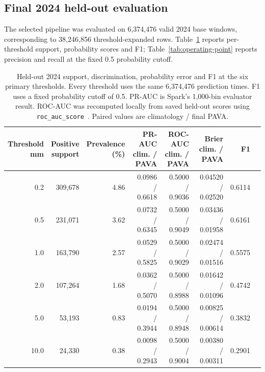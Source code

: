 \subsection{Final 2024 held-out evaluation}
The selected pipeline was evaluated on 6,374,476 valid 2024 base windows,
corresponding to 38,246,856 threshold-expanded rows.
Table~\ref{tab:test} reports per-threshold support, probability scores and
F1; Table~\ref{tab:operating-point} reports precision and recall at the fixed
0.5 probability cutoff.

\begin{table}[htbp]
\centering\scriptsize
\caption{Held-out 2024 support, discrimination, probability error and F1 at
the six primary thresholds. Every threshold uses the same 6,374,476 prediction
times. F1 uses a fixed probability cutoff of 0.5. PR-AUC is Spark's 1,000-bin
evaluator result. ROC-AUC was recomputed locally from saved held-out scores
using \texttt{roc\_auc\_score}~\cite{sklearnroc}. Paired values are
climatology / final PAVA.}
\label{tab:test}
\begin{tabular}{r r r r r r r r}
\toprule
\shortstack{Threshold\\mm} &
\shortstack{Positive\\support} &
\shortstack{Prevalence\\(\%)} &
\shortstack{PR-AUC\\clim. / PAVA} &
\shortstack{ROC-AUC\\clim. / PAVA} &
\shortstack{Brier\\clim. / PAVA} &
F1 \\
\midrule
0.2 & 309,678 & 4.86 & 0.0986 / 0.6618 & 0.5000 / 0.9036 & 0.04520 / 0.02520 & 0.6114 \\
0.5 & 231,071 & 3.62 & 0.0732 / 0.6345 & 0.5000 / 0.9049 & 0.03436 / 0.01958 & 0.6161 \\
1.0 & 163,790 & 2.57 & 0.0529 / 0.5825 & 0.5000 / 0.9029 & 0.02474 / 0.01516 & 0.5575 \\
2.0 & 107,264 & 1.68 & 0.0362 / 0.5070 & 0.5000 / 0.8988 & 0.01642 / 0.01096 & 0.4742 \\
5.0 & 53,193 & 0.83 & 0.0194 / 0.3944 & 0.5000 / 0.8948 & 0.00825 / 0.00614 & 0.3832 \\
10.0 & 24,330 & 0.38 & 0.0098 / 0.2943 & 0.5000 / 0.9004 & 0.00380 / 0.00311 & 0.2901 \\
\bottomrule
\end{tabular}
\end{table}

